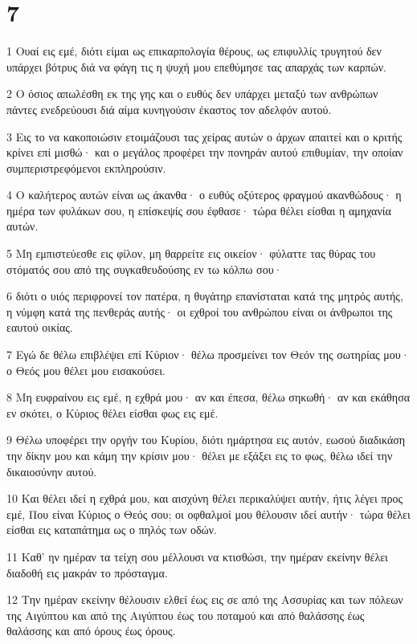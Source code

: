 \chapter{7}

\par 1 Ουαί εις εμέ, διότι είμαι ως επικαρπολογία θέρους, ως επιφυλλίς τρυγητού δεν υπάρχει βότρυς διά να φάγη τις η ψυχή μου επεθύμησε τας απαρχάς των καρπών.
\par 2 Ο όσιος απωλέσθη εκ της γης και ο ευθύς δεν υπάρχει μεταξύ των ανθρώπων πάντες ενεδρεύουσι διά αίμα κυνηγούσιν έκαστος τον αδελφόν αυτού.
\par 3 Εις το να κακοποιώσιν ετοιμάζουσι τας χείρας αυτών ο άρχων απαιτεί και ο κριτής κρίνει επί μισθώ· και ο μεγάλος προφέρει την πονηράν αυτού επιθυμίαν, την οποίαν συμπεριστρεφόμενοι εκπληρούσιν.
\par 4 Ο καλήτερος αυτών είναι ως άκανθα· ο ευθύς οξύτερος φραγμού ακανθώδους· η ημέρα των φυλάκων σου, η επίσκεψίς σου έφθασε· τώρα θέλει είσθαι η αμηχανία αυτών.
\par 5 Μη εμπιστεύεσθε εις φίλον, μη θαρρείτε εις οικείον· φύλαττε τας θύρας του στόματός σου από της συγκαθευδούσης εν τω κόλπω σου·
\par 6 διότι ο υιός περιφρονεί τον πατέρα, η θυγάτηρ επανίσταται κατά της μητρός αυτής, η νύμφη κατά της πενθεράς αυτής· οι εχθροί του ανθρώπου είναι οι άνθρωποι της εαυτού οικίας.
\par 7 Εγώ δε θέλω επιβλέψει επί Κύριον· θέλω προσμείνει τον Θεόν της σωτηρίας μου· ο Θεός μου θέλει μου εισακούσει.
\par 8 Μη ευφραίνου εις εμέ, η εχθρά μου· αν και έπεσα, θέλω σηκωθή· αν και εκάθησα εν σκότει, ο Κύριος θέλει είσθαι φως εις εμέ.
\par 9 Θέλω υποφέρει την οργήν του Κυρίου, διότι ημάρτησα εις αυτόν, εωσού διαδικάση την δίκην μου και κάμη την κρίσιν μου· θέλει με εξάξει εις το φως, θέλω ιδεί την δικαιοσύνην αυτού.
\par 10 Και θέλει ιδεί η εχθρά μου, και αισχύνη θέλει περικαλύψει αυτήν, ήτις λέγει προς εμέ, Που είναι Κύριος ο Θεός σου; οι οφθαλμοί μου θέλουσιν ιδεί αυτήν· τώρα θέλει είσθαι εις καταπάτημα ως ο πηλός των οδών.
\par 11 Καθ' ην ημέραν τα τείχη σου μέλλουσι να κτισθώσι, την ημέραν εκείνην θέλει διαδοθή εις μακράν το πρόσταγμα.
\par 12 Την ημέραν εκείνην θέλουσιν ελθεί έως εις σε από της Ασσυρίας και των πόλεων της Αιγύπτου και από της Αιγύπτου έως του ποταμού και από θαλάσσης έως θαλάσσης και από όρους έως όρους.
